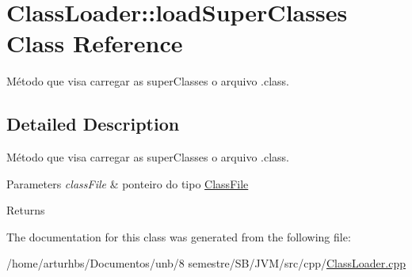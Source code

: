\hypertarget{classClassLoader_1_1loadSuperClasses}{}\section{Class\+Loader\+:\+:load\+Super\+Classes Class Reference}
\label{classClassLoader_1_1loadSuperClasses}


Método que visa carregar as super\+Classes o arquivo .class.  




\subsection{Detailed Description}
Método que visa carregar as super\+Classes o arquivo .class. 


\begin{DoxyParams}{Parameters}
{\em class\+File} & ponteiro do tipo \hyperlink{classClassFile}{Class\+File} \\
\hline
\end{DoxyParams}
\begin{DoxyReturn}{Returns}

\end{DoxyReturn}


The documentation for this class was generated from the following file\+:\begin{DoxyCompactItemize}
\item 
/home/arturhbs/\+Documentos/unb/8 semestre/\+S\+B/\+J\+V\+M/src/cpp/\hyperlink{ClassLoader_8cpp}{Class\+Loader.\+cpp}\end{DoxyCompactItemize}
